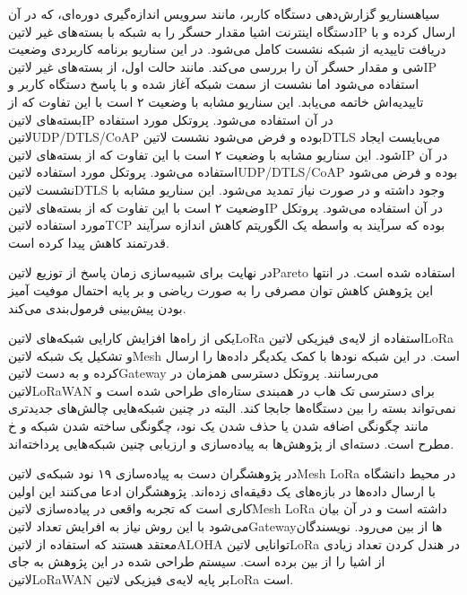  ‌سیاه{سناریو گزارش‌دهی دستگاه کاربر}، مانند سرویس اندازه‌گیری دوره‌ای، که در آن دستگاه اینترنت اشیا مقدار حسگر را
به شبکه با بسته‌های غیر ‌لاتین{IP} ارسال کرده و با دریافت تاییدیه از شبکه نشست کامل می‌شود.
 در این سناریو برنامه کاربردی وضعیت شی و مقدار حسگر آن را بررسی می‌کند. مانند حالت اول، از بسته‌های غیر ‌لاتین{IP} استفاده می‌شود اما
نشست از سمت شبکه آغاز شده و با پاسخ دستگاه کاربر و تاییدیه‌اش خاتمه می‌یابد.
 این سناریو مشابه با وضعیت ۲ است با این تفاوت که از بسته‌های ‌لاتین{IP} در آن استفاده می‌شود. پروتکل مورد استفاده ‌لاتین{UDP/DTLS/CoAP} بوده و فرض می‌شود نشست ‌لاتین{DTLS} می‌بایست ایجاد شود.
 این سناریو مشابه با وضعیت ۲ است با این تفاوت که از بسته‌های ‌لاتین{IP} در آن استفاده می‌شود. پروتکل مورد استفاده ‌لاتین{UDP/DTLS/CoAP} بوده و فرض می‌شود نشست ‌لاتین{DTLS} وجود داشته و در صورت نیاز تمدید می‌شود.
 این سناریو مشابه با وضعیت ۲ است با این تفاوت که از بسته‌های ‌لاتین{IP} در آن استفاده می‌شود. پروتکل مورد استفاده ‌لاتین{TCP} بوده که سرآیند به واسطه یک الگوریتم کاهش اندازه سرآیند قدرتمند کاهش پیدا کرده است.

در نهایت برای شبیه‌سازی زمان پاسخ از توزیع ‌لاتین{Pareto} استفاده شده است. در انتها این پژوهش کاهش توان مصرفی را به صورت ریاضی و بر پایه احتمال موفیت آمیز بودن پیش‌بینی فرمول‌بندی می‌کند.


یکی از راه‌ها افزایش کارایی شبکه‌های ‌لاتین{LoRa} استفاده از لایه‌ی فیزیکی ‌لاتین{LoRa} و تشکیل یک شبکه ‌لاتین{Mesh} است. در این شبکه نودها با کمک یکدیگر داده‌ها را ارسال کرده و به دست ‌لاتین{Gateway} می‌رسانند.
پروتکل دسترسی همزمان در ‌لاتین{LoRaWAN} برای دسترسی تک هاب در همبندی ستاره‌ای طراحی شده است و نمی‌تواند بسته را بین دستگاه‌ها جابجا کند.
البته در چنین شبکه‌هایی چالش‌های جدیدتری مانند چگونگی اضافه شدن یا حذف شدن یک نود، چگونگی ساخته شدن شبکه و ‌خ مطرح است. دسته‌ای از پژوهش‌ها به پیاده‌سازی و ارزیابی چنین شبکه‌هایی پرداخته‌اند.


در  پژوهشگران دست به پیاده‌سازی ۱۹ نود شبکه‌ی ‌لاتین{Mesh LoRa} در محیط دانشگاه با ارسال داده‌ها در بازه‌های یک دقیقه‌ای زده‌اند.
پژوهشگران ادعا می‌کنند این اولین کاری است که تجربه واقعی در پیاده‌سازی ‌لاتین{Mesh LoRa} داشته است و در آن بیان می‌شود با این روش نیاز به افرایش تعداد ‌لاتین{Gateway}ها از بین می‌رود.
نویسندگان معتقد هستند که استفاده از ‌لاتین{ALOHA} توانایی ‌لاتین{LoRa} در هندل کردن تعداد زیادی از اشیا را از بین برده است.
سیستم طراحی شده در این پژوهش به جای ‌لاتین{LoRaWAN} بر پایه لایه‌ی فیزیکی ‌لاتین{LoRa} است.


